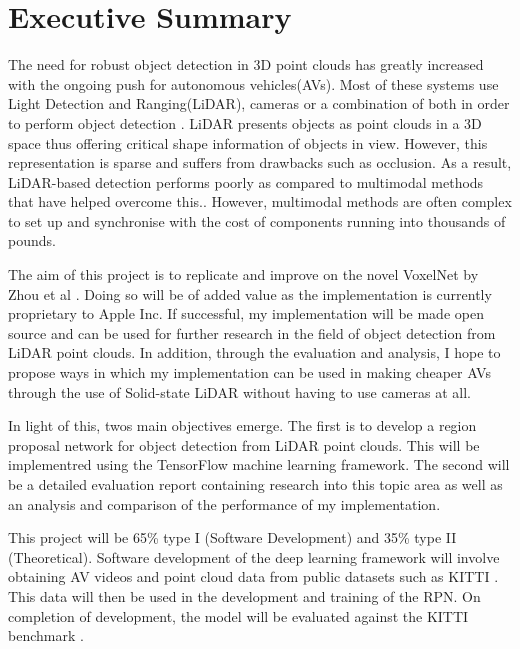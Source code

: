 %
%
%

\chapter*{Executive Summary}
\begin{SingleSpace}
\initial 
{T}he need for robust object detection in 3D point clouds has greatly increased with the ongoing push for autonomous vehicles(AVs). Most of these systems use Light Detection and Ranging(LiDAR), cameras or a combination of both in order to perform object detection \cite{ku2017joint}. LiDAR presents objects as point clouds in a 3D space thus offering critical shape information of objects in view. However, this representation is sparse and suffers from drawbacks such as occlusion. As a result, LiDAR-based detection performs poorly as compared to multimodal methods that have helped overcome this.\cite{zhou2017voxelnet}. However, multimodal methods are often complex to set up and synchronise \cite{ku2017joint} with the cost of components running into thousands of pounds.

The aim of this project is to replicate and improve on the novel  VoxelNet  by Zhou et al \cite{zhou2017voxelnet}. 
Doing so will be of added value as the implementation is currently proprietary to Apple Inc. If successful, my implementation will be made open source and can be used for further research in the field of object detection from LiDAR point clouds. In addition, through the evaluation and analysis, I hope to propose ways in which my implementation can be used in making cheaper AVs through the use of Solid-state LiDAR without having to use cameras at all. 

In light of this, twos main objectives emerge. The first is to develop a region proposal network for object detection from LiDAR point clouds. This will be implementred using the TensorFlow \cite{abadi2016tensorflow.} machine learning framework.
The second will be a detailed evaluation report containing research into this topic area as well as an analysis and comparison of the performance of my implementation. 

This project will be 65\% type I (Software Development)  and 35\% type II (Theoretical). Software development of the deep learning framework will involve obtaining AV videos and point cloud data from public datasets such as KITTI \cite{Geiger2013IJRR}. This data will then be used in the development and training of the RPN. On completion of development, the model will be evaluated against the KITTI benchmark \cite{Geiger2012CVPR}.



\clearpage

\end{SingleSpace}

